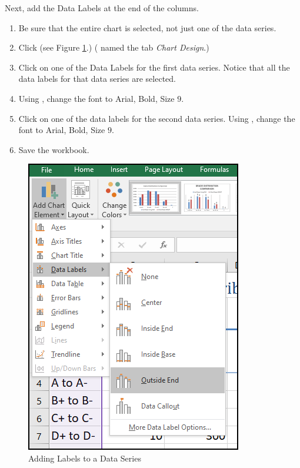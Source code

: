 Next, add the Data Labels at the end of the columns.

\begin{enumbox}
	\begin{enumerate}
		\item Be sure that the entire chart is selected, not just one of the data series. 
		\item Click  (see Figure \ref{04:fig38}.) ( named the tab \textit{Chart Design}.)
		\item Click on one of the Data Labels for the first data series. Notice that all the data labels for that data series are selected.
		\item Using , change the font to Arial, Bold, Size $ 9 $.
		\item Click on one of the data labels for the second data series. Using , change the font to Arial, Bold, Size $ 9 $.
		\item Save the  workbook.
	\end{enumerate}
\end{enumbox}
	
\begin{figure}[H]
	\centering
	\includegraphics[width=\maxwidth{.75\linewidth}]{gfx/ch04_fig38}
	\caption{Adding Labels to a Data Series}
	\label{04:fig38}
\end{figure}

